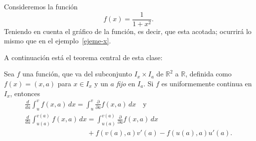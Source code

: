 \documentclass[mid,fleqn,draft,twoside]{notasdeclase}
\newcommand{\inte}[4]{\int_{#1}^{#2} #3\, d#4}
\renewcommand{\t}{\times}
\newcommand{\pd}[1]{\frac{\partial}{\partial #1}}
\newcommand{\der}[1]{\frac{d}{d#1}}
\newcommand{\R}{\mathbb{R}}
\begin{document}
\begin{ejem}
	Consideremos la función
	\[ f(x)=\frac{1}{1+x^2}. \]
	Teniendo en cuenta el gráfico de la función, es decir, que esta acotada; ocurrirá lo mismo que en el ejemplo~\ref{ejeme-x}.
\end{ejem}

A continuación está el teorema central de esta clase:
\begin{teo}
	Sea $f$ una función, que va del subconjunto $I_x\t I_a$ de $\R^2$ a $\R$, definida como $f(x) = (x,a)$ para $x\in I_x$ y un $a$ \emph{fijo} en $I_a$. Si $f$ es uniformemente continua en $I_x$, entonces
	\begin{gather}
	\der{a} \inte{u}{v}{f(x,a)}{x} = \inte{u}{v}{\pd{a} f(x,a)}{x} \quad\text{y} \\ 
	\der{a} \inte{u(a)}{v(a)}{f(x,a)}{x} = \inte{u(a)}{v(a)}{\pd{a} f(x,a)}{x}  \\
	\hspace{9em} + f(v(a),a)v'(a) - f(u(a),a)u'(a). \nonumber
	\end{gather}
\end{teo}
\end{document}

